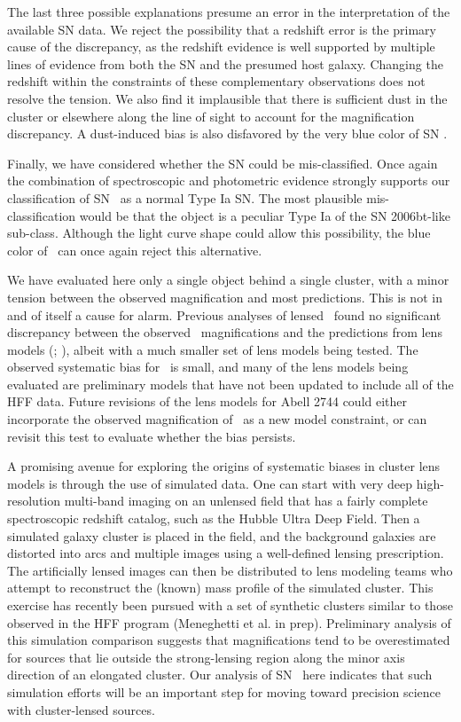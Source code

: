 The last three possible explanations presume an error in the
interpretation of the available SN data.  We reject the possibility
that a redshift error is the primary cause of the discrepancy, as the
redshift evidence is well supported by multiple lines of evidence from
both the SN and the presumed host galaxy. Changing the redshift within
the constraints of these complementary observations does not resolve
the tension. We also find it implausible that there is sufficient dust
in the cluster or elsewhere along the line of sight to account for the
magnification discrepancy.  A dust-induced bias is also disfavored by
the very blue color of SN \tomas.

Finally, we have considered whether the SN could be
mis-classified. Once again the combination of spectroscopic and
photometric evidence strongly supports our classification of
SN \tomas\ as a normal Type Ia SN.  The most plausible
mis-classification would be that the object is a peculiar Type Ia of
the SN 2006bt-like sub-class.  Although the light curve shape could
allow this possibility, the blue color of \tomas\ can once again
reject this alternative. 


We have evaluated here only a single object behind a single cluster,
with a minor tension between the observed magnification and most
predictions.  This is not in and of itself a cause for alarm.
Previous analyses of lensed \SNIa\ found no significant discrepancy
between the observed \SNIa\ magnifications and the predictions from
lens models (; \citealt{Nordin:2014}), albeit
with a much smaller set of lens models being tested.  The observed
systematic bias for \tomas\ is small, and many of the lens models
being evaluated are preliminary models that have not been updated to
include all of the HFF data.  Future revisions of the lens models for
Abell 2744 could either incorporate the observed magnification
of \tomas\ as a new model constraint, or can revisit this test to
evaluate whether the bias persists.

A promising avenue for exploring the origins of systematic biases in
cluster lens models is through the use of simulated data.  One can
start with very deep high-resolution multi-band imaging on an unlensed
field that has a fairly complete spectroscopic redshift catalog, such
as the Hubble Ultra Deep Field.  Then a simulated galaxy cluster is
placed in the field, and the background galaxies are distorted into
arcs and multiple images using a well-defined lensing prescription.
The artificially lensed images can then be distributed to lens
modeling teams who attempt to reconstruct the (known) mass profile of
the simulated cluster.  This exercise has recently been pursued with a
set of synthetic clusters similar to those observed in the HFF program
(Meneghetti et al. in prep).  Preliminary analysis of this simulation
comparison suggests that magnifications tend to be
overestimated for sources that lie outside the strong-lensing region
along the minor axis direction of an elongated cluster.  Our analysis
of SN \tomas\ here indicates that such simulation efforts will be an
important step for moving toward precision science with cluster-lensed
sources. 

